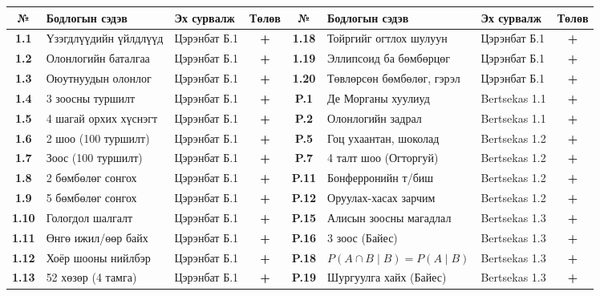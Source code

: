 \documentclass[11pt,a4paper]{article}
\newcommand{\checked}{\textcolor{success}{\textbf{+}}}
\begin{document}
{\small
\begin{center}
\setlength{\tabcolsep}{3pt}\small\begin{tabularx}{\textwidth}{@{}c X l c | c X l c@{}}
\toprule
\rowcolor{mist}
\textbf{№} & \textbf{Бодлогын сэдэв} & \textbf{Эх сурвалж} & \textbf{Төлөв} &
\textbf{№} & \textbf{Бодлогын сэдэв} & \textbf{Эх сурвалж} & \textbf{Төлөв} \\
\midrule
\textbf{1.1} & Үзэгдлүүдийн үйлдлүүд & Цэрэнбат Б.1 & \checked & \textbf{1.18} & Тойргийг огтлох шулуун & Цэрэнбат Б.1 & \checked \\
\textbf{1.2} & Олонлогийн баталгаа & Цэрэнбат Б.1 & \checked & \textbf{1.19} & Эллипсоид ба бөмбөрцөг & Цэрэнбат Б.1 & \checked \\
\textbf{1.3} & Оюутнуудын олонлог & Цэрэнбат Б.1 & \checked & \textbf{1.20} & Төвлөрсөн бөмбөлөг, гэрэл & Цэрэнбат Б.1 & \checked \\
\textbf{1.4} & 3 зоосны туршилт & Цэрэнбат Б.1 & \checked & \textbf{P.1} & Де Морганы хуулиуд & Bertsekas 1.1 & \checked \\
\textbf{1.5} & 4 шагай орхих хүснэгт & Цэрэнбат Б.1 & \checked & \textbf{P.2} & Олонлогийн задрал & Bertsekas 1.1 & \checked \\
\textbf{1.6} & 2 шоо (100 туршилт) & Цэрэнбат Б.1 & \checked & \textbf{P.5} & Гоц ухаантан, шоколад & Bertsekas 1.2 & \checked \\
\textbf{1.7} & Зоос (100 туршилт) & Цэрэнбат Б.1 & \checked & \textbf{P.7} & 4 талт шоо (Огторгуй) & Bertsekas 1.2 & \checked \\
\textbf{1.8} & 2 бөмбөлөг сонгох & Цэрэнбат Б.1 & \checked & \textbf{P.11} & Бонферронийн т/биш & Bertsekas 1.2 & \checked \\
\textbf{1.9} & 5 бөмбөлөг сонгох & Цэрэнбат Б.1 & \checked & \textbf{P.12} & Оруулах-хасах зарчим & Bertsekas 1.2 & \checked \\
\textbf{1.10} & Гологдол шалгалт & Цэрэнбат Б.1 & \checked & \textbf{P.15} & Алисын зоосны магадлал & Bertsekas 1.3 & \checked \\
\textbf{1.11} & Өнгө ижил/өөр байх & Цэрэнбат Б.1 & \checked & \textbf{P.16} & 3 зоос (Байес) & Bertsekas 1.3 & \checked \\
\textbf{1.12} & Хоёр шооны нийлбэр & Цэрэнбат Б.1 & \checked & \textbf{P.18} & \texorpdfstring{$P(A\cap B\mid B)=P(A\mid B)$}{P(A cap B | B) = P(A | B)} & Bertsekas 1.3 & \checked \\
\textbf{1.13} & 52 хөзөр (4 тамга) & Цэрэнбат Б.1 & \checked & \textbf{P.19} & Шургуулга хайх (Байес) & Bertsekas 1.3 & \checked \\

\end{tabularx}
\end{center}}
\end{document}
